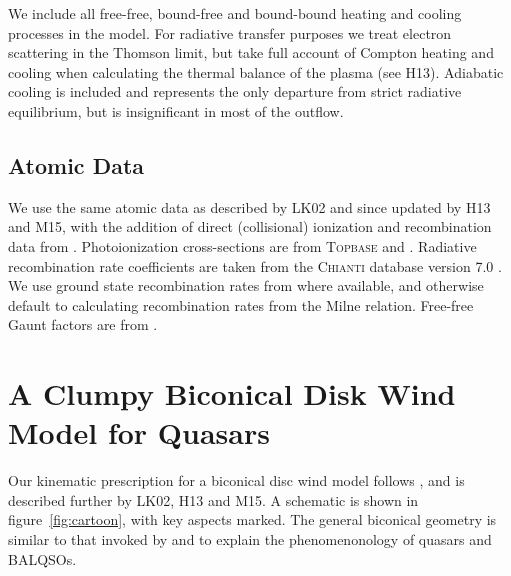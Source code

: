 \documentclass[useAMS,usenatbib]{mn2e_x}
\begin{document}
We include all free-free, bound-free and bound-bound heating
and cooling processes in the model. For radiative transfer purposes
we treat electron scattering in the Thomson limit, 
but take full account of Compton heating and cooling when
calculating the thermal balance of the plasma (see H13).
Adiabatic cooling is included and represents the only
departure from strict radiative equilibrium, but is insignificant 
in most of the outflow.



\subsection{Atomic Data}

We use the same atomic data as described by LK02 and since updated by H13 and M15, 
with the addition of direct (collisional) ionization and recombination
data from \cite{dere2007}. 
Photoionization cross-sections are from \textsc{Topbase} \citep{cunto1993} and \cite{vfky}.
Radiative recombination rate coefficients are taken from 
the \textsc{Chianti} database version 7.0 \citep{dere1997,landi2012}.
We use ground state recombination rates from \cite{badnell2006} where available,
and otherwise default to calculating recombination rates from the Milne
relation. Free-free Gaunt factors are from \cite{sutherland1998}.





%
%

\section{A Clumpy Biconical Disk Wind Model for Quasars}

Our kinematic prescription for a biconical disc wind model
follows \cite{SV93}, and is described further by
LK02, H13 and M15. A schematic is shown in figure~\ref{fig:cartoon},
with key aspects marked. The general biconical
geometry is similar to that invoked by \cite{MCGV95} and 
\cite{elvis2000} to explain the phenomenonology
of quasars and BALQSOs.
\end{document}
